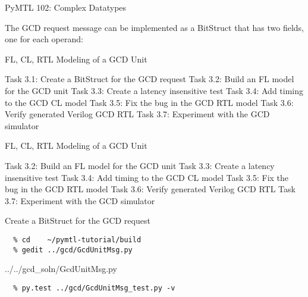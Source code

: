 \begin{frame}{PyMTL 102: Complex Datatypes}

The GCD request message can be implemented as a BitStruct that has two
fields, one for each operand:

\vspace{.2in}
\end{frame}


\begin{frame}{ FL, CL, RTL Modeling of a GCD Unit}
\begin{cbxlist}
  \1 Task 3.1: Create a BitStruct for the GCD request
  \1 Task 3.2: Build an FL model for the GCD unit
  \1 Task 3.3: Create a latency insensitive test
  \1 Task 3.4: Add timing to the GCD CL model
  \1 Task 3.5: Fix the bug in the GCD RTL model
  \1 Task 3.6: Verify generated Verilog GCD RTL
  \1 Task 3.7: Experiment with the GCD simulator
\end{cbxlist}
\end{frame}

\begin{frame}{ FL, CL, RTL Modeling of a GCD Unit}
\begin{cbxlist}
  \1 
  \1 Task 3.2: Build an FL model for the GCD unit
  \1 Task 3.3: Create a latency insensitive test
  \1 Task 3.4: Add timing to the GCD CL model
  \1 Task 3.5: Fix the bug in the GCD RTL model
  \1 Task 3.6: Verify generated Verilog GCD RTL
  \1 Task 3.7: Experiment with the GCD simulator
\end{cbxlist}
\end{frame}

\begin{task}\begin{frame}[fragile]{Create a BitStruct for the GCD request}
\vspace{-0.25in}
\begin{verbatim}
  % cd    ~/pymtl-tutorial/build
  % gedit ../gcd/GcdUnitMsg.py
\end{verbatim}

%
{../../gcd_soln/GcdUnitMsg.py}

\begin{verbatim}
  % py.test ../gcd/GcdUnitMsg_test.py -v
\end{verbatim}
\end{frame}
\end{task}

